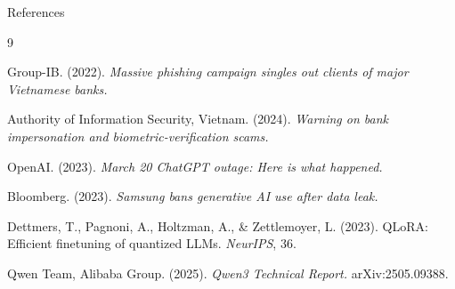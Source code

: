 \begin{frame}[allowframebreaks]{References}
  \begin{thebibliography}{9}

    Group-IB. (2022).
    \textit{Massive phishing campaign singles out clients of major Vietnamese banks.}

    Authority of Information Security, Vietnam. (2024).
    \textit{Warning on bank impersonation and biometric-verification scams.}

    OpenAI. (2023).
    \textit{March 20 ChatGPT outage: Here is what happened.}

    Bloomberg. (2023).
    \textit{Samsung bans generative AI use after data leak.}

    Dettmers, T., Pagnoni, A., Holtzman, A., \& Zettlemoyer, L. (2023).
    QLoRA: Efficient finetuning of quantized LLMs.
    \textit{NeurIPS}, 36.

    Qwen Team, Alibaba Group. (2025).
    \textit{Qwen3 Technical Report.}
    arXiv:2505.09388.

  \end{thebibliography}
\end{frame}
